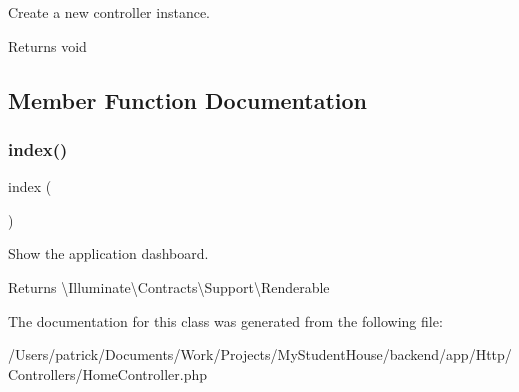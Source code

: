 Create a new controller instance.

\begin{DoxyReturn}{Returns}
void 
\end{DoxyReturn}


\subsection{Member Function Documentation}
\mbox{\label{class_app_1_1_http_1_1_controllers_1_1_home_controller_a149eb92716c1084a935e04a8d95f7347}} 
\subsubsection{\texorpdfstring{index()}{index()}}
{\footnotesize\ttfamily index (\begin{DoxyParamCaption}{ }\end{DoxyParamCaption})}

Show the application dashboard.

\begin{DoxyReturn}{Returns}
\textbackslash{}\+Illuminate\textbackslash{}\+Contracts\textbackslash{}\+Support\textbackslash{}\+Renderable 
\end{DoxyReturn}


The documentation for this class was generated from the following file\+:\begin{DoxyCompactItemize}
\item 
/\+Users/patrick/\+Documents/\+Work/\+Projects/\+My\+Student\+House/backend/app/\+Http/\+Controllers/Home\+Controller.\+php\end{DoxyCompactItemize}
